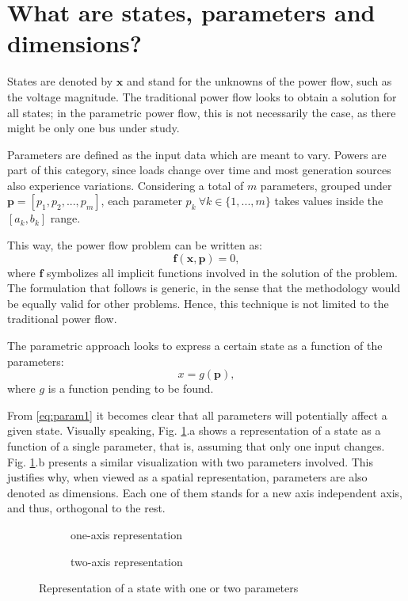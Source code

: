 \section{What are states, parameters and dimensions?}
States are denoted by $\mathbf{x}$ and stand for the unknowns of the power flow, such as the voltage magnitude. The traditional power flow looks to obtain a solution for all states; in the parametric power flow, this is not necessarily the case, as there might be only one bus under study. 

Parameters are defined as the input data which are meant to vary. Powers are part of this category, since loads change over time and most generation sources also experience variations. Considering a total of $m$ parameters, grouped under $\mathbf{p} = [p_1, p_2, ..., p_m]$, each parameter $p_k \ \forall k \in \{1, ..., m\}$ takes values inside the $[a_k, b_k]$ range. 

This way, the power flow problem can be written as:
\begin{equation}
  \mathbf{f}(\mathbf{x}, \mathbf{p}) = 0,
  \label{eq:power1}
\end{equation}
where $\mathbf{f}$ symbolizes all implicit functions involved in the solution of the problem. The formulation that follows is generic, in the sense that the methodology would be equally valid for other problems. Hence, this technique is not limited to the traditional power flow. 

The parametric approach looks to express a certain state as a function of the parameters:
\begin{equation}
  x = g(\mathbf{p}), 
  \label{eq:param1}
\end{equation}
where $g$ is a function pending to be found. 

From \eqref{eq:param1} it becomes clear that all parameters will potentially affect a given state. Visually speaking, Fig. \ref{fig:1ax}.a shows a representation of a state as a function of a single parameter, that is, assuming that only one input changes. Fig. \ref{fig:1ax}.b presents a similar visualization with two parameters involved. This justifies why, when viewed as a spatial representation, parameters are also denoted as dimensions. Each one of them stands for a new axis independent axis, and thus, orthogonal to the rest. 

\begin{figure}[!htb]

  \begin{subfigure}{0.49\textwidth}
    \caption{one-axis representation}
  \end{subfigure}
  \hspace*{\fill}
  \begin{subfigure}{0.49\textwidth}
    \caption{two-axis representation}
  \end{subfigure}

  \caption{Representation of a state with one or two parameters}
  \label{fig:1ax}
\end{figure}

